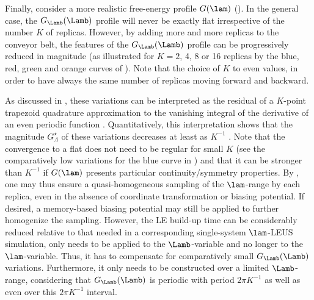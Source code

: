 Finally, consider a more realistic free-energy profile $G(\lam)$ (). 
In the general case, the $G_{\Lamb}(\Lamb)$ profile will never be exactly flat irrespective 
of the number $K$ of replicas. However, by adding more and more replicas to the conveyor belt, 
the features of the $G_{\Lamb}(\Lamb)$ profile can be progressively reduced in magnitude 
(as illustrated for $K=2$, 4, 8 or 16 replicas by the blue, red, green and orange curves of ). 
%
%
Note that  the choice of $K$ to even values, 
in order to have always the same number of replicas moving forward and backward. 

%
As discussed in , 
these variations
can be interpreted as
the residual of a $K$-point trapezoid quadrature approximation to the vanishing integral of the derivative of an even periodic function . Quantitatively, this interpretation shows that the magnitude $G^{\star}_{\Lambda}$ of 
these variations decreases at least as $K^{-1}$ . 
%
%
Note that the convergence to a flat 
does not need to be regular for small $K$ (see \eg{} the comparatively low variations for the blue curve in ) and that it can be stronger than $K^{-1}$  if $G(\lam)$ presents particular continuity/symmetry properties.
%
By , one may thus ensure a quasi-homogeneous sampling of the $\lam$-range by each replica, even in the absence of coordinate transformation or biasing potential. If desired, a memory-based biasing potential may still be applied to further homogenize the sampling. However, the LE build-up time 
can
be considerably reduced relative to that needed in a corresponding single-system $\lam$-LEUS simulation,  only needs to be applied to the $\Lamb$-variable and no longer to the $\lam$-variable. Thus, it has to compensate for comparatively small $G_{\Lamb}(\Lamb)$ variations. Furthermore, it only needs to be constructed over a limited $\Lamb$-range, considering that $G_{\Lamb}(\Lamb)$ is periodic with period $2\pi K^{-1}$ as well as even over this $2\pi K^{-1}$ interval. 

